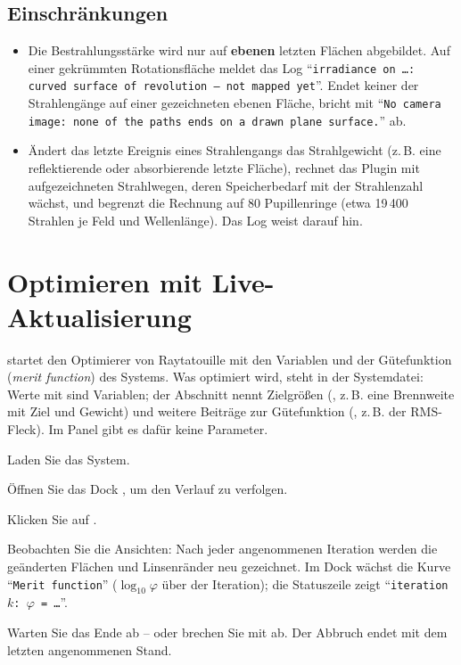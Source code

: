 \subsection{Einschränkungen}

\begin{itemize}
  \item Die Bestrahlungsstärke wird nur auf \textbf{ebenen} letzten Flächen abgebildet. Auf einer
    gekrümmten Rotationsfläche meldet das Log \enquote{\texttt{irradiance on …: curved surface of
    revolution – not mapped yet}}. Endet keiner der Strahlengänge auf einer gezeichneten ebenen
    Fläche, bricht  mit \enquote{\texttt{No camera image: none of the paths
    ends on a drawn plane surface.}} ab.
  \item Ändert das letzte Ereignis eines Strahlengangs das Strahlgewicht (z.\,B. eine
    reflektierende oder absorbierende letzte Fläche), rechnet das Plugin mit aufgezeichneten
    Strahlwegen, deren Speicherbedarf mit der Strahlenzahl wächst, und begrenzt die Rechnung auf
    80 Pupillenringe (etwa 19\,400 Strahlen je Feld und Wellenlänge). Das Log weist darauf hin.
\end{itemize}

\section{Optimieren mit Live-Aktualisierung}\label{sec:rt-optimieren}

 startet den Optimierer von Raytatouille mit den Variablen und der Gütefunktion
(\emph{merit function}) des Systems. Was optimiert wird, steht in der Systemdatei: Werte mit
 sind Variablen; der Abschnitt  nennt Zielgrößen
(, z.\,B. eine Brennweite mit Ziel und Gewicht) und weitere Beiträge zur
Gütefunktion (, z.\,B. der RMS-Fleck). Im Panel gibt es dafür keine
Parameter.

\begin{schritte}
  \item Laden Sie das System.
  \item Öffnen Sie das Dock , um den Verlauf zu verfolgen.
  \item Klicken Sie auf .
  \item Beobachten Sie die Ansichten: Nach jeder angenommenen Iteration werden die geänderten
    Flächen und Linsenränder neu gezeichnet. Im Dock  wächst die Kurve
    \enquote{\texttt{Merit function}} ($\log_{10}\varphi$ über der Iteration); die Statuszeile
    zeigt \enquote{\texttt{iteration }$k$\texttt{: }$\varphi$\texttt{ = …}}.
  \item Warten Sie das Ende ab -- oder brechen Sie mit  ab. Der Abbruch endet mit dem
    letzten angenommenen Stand.
\end{schritte}

